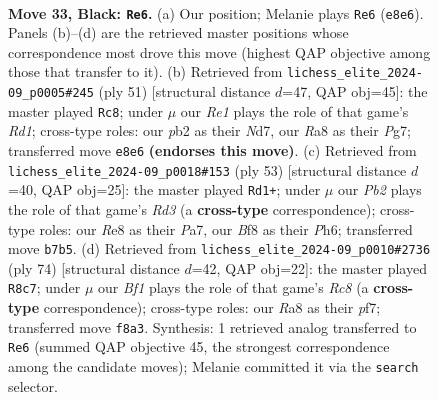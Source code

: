 \documentclass[11pt]{article}
\begin{document}
\clearpage

\begin{figure}[p]\centering
\begin{subfigure}{0.46\textwidth}\centering
\resizebox{\linewidth}{!}{%
\newchessgame
\chessboard[
  setfen={r3rb2/ppp4k/5pp1/3N3p/P7/6P1/RPP2P1P/6K1 b - - 0 33},
  showmover=false,
  pgfstyle=straightmove, color=movearrow, markmove={e8-e6}
]}
\caption{}
\end{subfigure}\hfill
\begin{subfigure}{0.46\textwidth}\centering
\resizebox{\linewidth}{!}{%
\newchessgame
\chessboard[
  setfen={3r1k2/pppn1pp1/7p/1N1P4/2P1R3/7P/P4PP1/5K2 b - - 4 26},
  showmover=false,
  pgfstyle=straightmove, color=movearrow, markmove={d8-c8}
]}
\caption{}
\end{subfigure}
\\[4pt]
\begin{subfigure}{0.46\textwidth}\centering
\resizebox{\linewidth}{!}{%
\newchessgame
\chessboard[
  setfen={3r2k1/p4pp1/3r3p/2p1R3/4p3/1P2P1P1/P4P1P/R5K1 b - - 0 27},
  showmover=false,
  pgfstyle=straightmove, color=movearrow, markmove={d6-d1}
]}
\caption{}
\end{subfigure}\hfill
\begin{subfigure}{0.46\textwidth}\centering
\resizebox{\linewidth}{!}{%
\newchessgame
\chessboard[
  setfen={2R5/p3rppk/8/4p2p/3n3P/1P4P1/P4P2/2R3K1 w - - 2 38},
  showmover=false,
  pgfstyle=straightmove, color=movearrow, markmove={c8-c7}
]}
\caption{}
\end{subfigure}
\caption{\textbf{Move 33, Black: \texttt{Re6}.} (a) Our position; Melanie plays \texttt{Re6} (\texttt{e8e6}). Panels (b)--(d) are the retrieved master positions whose correspondence most drove this move (highest QAP objective among those that transfer to it). (b) Retrieved from \texttt{lichess\_elite\_2024-09\_p0005\#245} (ply 51) [structural distance $d$=47, QAP obj=45]: the master played \texttt{Rc8}; under $\mu$ our \emph{Re1} plays the role of that game's \emph{Rd1}; cross-type roles: our \emph{p}b2 as their \emph{N}d7, our \emph{R}a8 as their \emph{P}g7; transferred move \texttt{e8e6} \textbf{(endorses this move)}. (c) Retrieved from \texttt{lichess\_elite\_2024-09\_p0018\#153} (ply 53) [structural distance $d$=40, QAP obj=25]: the master played \texttt{Rd1+}; under $\mu$ our \emph{Pb2} plays the role of that game's \emph{Rd3} (a \textbf{cross-type} correspondence); cross-type roles: our \emph{R}e8 as their \emph{P}a7, our \emph{B}f8 as their \emph{P}h6; transferred move \texttt{b7b5}. (d) Retrieved from \texttt{lichess\_elite\_2024-09\_p0010\#2736} (ply 74) [structural distance $d$=42, QAP obj=22]: the master played \texttt{R8c7}; under $\mu$ our \emph{Bf1} plays the role of that game's \emph{Rc8} (a \textbf{cross-type} correspondence); cross-type roles: our \emph{R}a8 as their \emph{p}f7; transferred move \texttt{f8a3}. Synthesis: 1 retrieved analog transferred to \texttt{Re6} (summed QAP objective 45, the strongest correspondence among the candidate moves); Melanie committed it via the \texttt{search} selector.}
\label{fig:thought-m65}
\end{figure}
\end{document}
